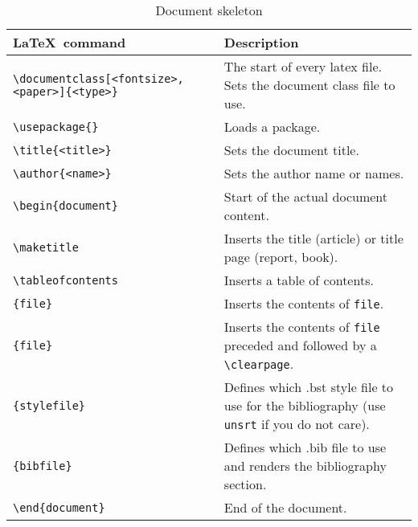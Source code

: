 \documentclass{article}
\begin{document}
\begin{table}[htbp]
\caption{Document skeleton}
\begin{tabularx}{\textwidth}{lX}
	\toprule
	\LaTeX~command                                           & Description                                                                                     \\ 
	\midrule
	\verb|\documentclass|\verb|[<fontsize>,<paper>]{<type>}| & The start of every latex file. Sets the document class file to use.                             \\
	\verb|\usepackage|\verb|{}|                              & Loads a package.                                                                                \\
	\verb|\title|\verb|{<title>}|                            & Sets the document title.                                                                        \\
	\verb|\author|\verb|{<name>}|                            & Sets the author name or names.                                                                  \\
	\verb|\begin|\verb|{document}|	                                 & Start of the actual document content.                                                           \\
	\verb|\maketitle|                                 	     & Inserts the title (article) or title page (report, book).                                        \\
	\verb|\tableofcontents|                                  & Inserts a table of contents.                                                                    \\
	\verb||\verb|{file}|                               & Inserts the contents of \verb|file|.                                                            \\
	\verb||\verb|{file}|                             & Inserts the contents of \verb|file| preceded and followed by a \verb|\clearpage|.               \\
	\verb||\verb|{stylefile}|              & Defines which .bst style file to use for the bibliography (use \verb|unsrt| if you do not care). \\
	\verb||\verb|{bibfile}|                     & Defines which .bib file to use and renders the bibliography section.                            \\ 
	\verb|\en|\verb|d{document}|	                         & End of the document.                                                                            \\
	\bottomrule
\end{tabularx}
\end{table}
\end{document}
